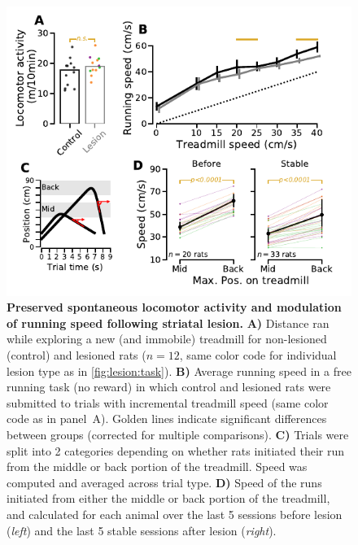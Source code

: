 \begin{figure}[bth!]
	\begin{center}
		\includegraphics[scale=1]{ch-lesion/figures/MotorPreserved.pdf}
		\caption
		{\textbf{Preserved spontaneous locomotor activity and modulation of running speed following striatal lesion.}
		\textbf{A)} Distance ran while exploring a new (and immobile) treadmill for non-lesioned (control) and lesioned rats ($n=12$, same color code for individual lesion type as in \autoref{fig:lesion:task}).
		\textbf{B)} Average running speed in a free running task (no reward) in which control and lesioned rats were submitted to trials with incremental treadmill speed (same color code as in panel~A).
		Golden lines indicate significant differences between groups (corrected for multiple comparisons).
		\textbf{C)} Trials were split into 2 categories depending on whether rats initiated their run from the middle or back portion of the treadmill.
		Speed was computed and averaged across trial type.
		\textbf{D)} Speed of the runs initiated from either the middle or back portion of the treadmill, and calculated for each animal over the last 5 sessions before lesion (\textit{left}) and the last 5 stable sessions after lesion (\textit{right}).
		}
		\label{fig:lesion:motorOk}
	\end{center}
\end{figure}